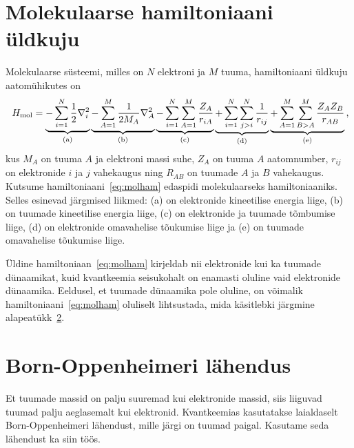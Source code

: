 \documentclass[12pt]{report}
\begin{document}
\section{Molekulaarse hamiltoniaani üldkuju}\label{sec:molhamgen}

Molekulaarse süsteemi, milles on \(N\) elektroni ja \(M\) tuuma, hamiltoniaani üldkuju aatom\-ühikutes on
\begin{align}\label{eq:molham}
    H_\text{mol} =
    \underbrace{- \sum_{i = 1}^N \frac{1}{2} \nabla_i^2}_\text{(a)}
    \underbrace{- \sum_{A = 1}^M \frac{1}{2 M_A} \nabla_A^2}_\text{(b)}
    \underbrace{- \sum_{i = 1}^N \sum_{A = 1}^M \frac{Z_A}{r_{iA}}}_\text{(c)}
    \underbrace{+ \sum_{i = 1}^N \sum_{j > i}^N \frac{1}{r_{ij}}}_\text{(d)}
    \underbrace{+ \sum_{A = 1}^M \sum_{B > A}^M \frac{Z_A Z_B}{r_{AB}}}_\text{(e)} \rlap{,}
\end{align}
kus \(M_A\) on tuuma \(A\) ja elektroni massi suhe, \(Z_A\) on tuuma \(A\) aatomnumber, \(r_{ij}\) on elektronide \(i\) ja \(j\) vahekaugus ning \(R_{AB}\) on tuumade \(A\) ja \(B\) vahekaugus.
Kutsume hamiltoniaani~\eqref{eq:molham} edaspidi molekulaarseks hamiltoniaaniks.
Selles esinevad järgmised liikmed: (a) on elektronide kineetilise energia liige, (b) on tuumade kineetilise energia liige, (c) on elektronide ja tuumade tõmbumise liige, (d) on elektronide omavahelise tõukumise liige ja (e) on tuumade omavahelise tõukumise liige.

Üldine hamiltoniaan~\eqref{eq:molham} kirjeldab nii elektronide kui ka tuumade dünaamikat, kuid kvantkeemia seisukohalt on enamasti oluline vaid elektronide dünaamika.
Eeldusel, et tuumade dünaamika pole oluline, on võimalik hamiltoniaani~\eqref{eq:molham} oluliselt lihtsustada, mida käsitlebki järgmine alapeatükk~\ref{sec:bornopen}.

\section{Born-Oppenheimeri lähendus}\label{sec:bornopen}

Et tuumade massid on palju suuremad kui elektronide massid, siis liiguvad tuumad palju aeglasemalt kui elektronid.
Kvantkeemias kasutatakse laialdaselt Born-Oppenheimeri lähendust, mille järgi on tuumad paigal.
Kasutame seda lähendust ka siin töös.
\end{document}
